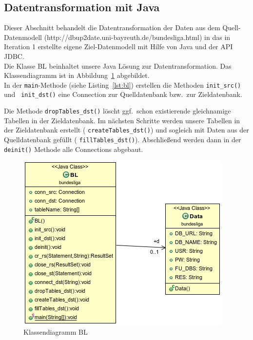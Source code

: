 \documentclass[
10pt,
a4paper
]{scrartcl}
\begin{document}
\subsection{Datentransformation mit Java}

Dieser Abschnitt behandelt die Datentransformation der Daten aus dem Quell-Datenmodell (http://dbup2date.uni-bayreuth.de/bundesliga.html) in das in Iteration 1 erstellte eigene Ziel-Datenmodell mit Hilfe von Java und der API JDBC.\\

Die Klasse BL beinhaltet unsere Java L\"{o}sung zur Datentransformation. Das Klassendiagramm ist in Abbildung~\ref{fig:BL} abgebildet.\\

In der  \texttt{main}-Methode (siehe Listing~\ref{lst:bl}) erstellen die Methoden  \texttt{init\_src()} und \texttt{ init\_dst()} eine Connection zur Quelldatenbank bzw.~zur Zieldatenbank.



Die Methode \texttt{dropTables\_dst()} l\"{o}scht ggf.~schon existierende gleichnamige Tabellen in der Zieldatenbank. Im n\"{a}chsten Schritte werden unsere Tabellen in der Zieldatenbank erstellt ( \texttt{createTables\_dst()}) und sogleich mit Daten aus der Quelldatenbank gef\"{u}llt ( \texttt{fillTables\_dst()}). Abschlie{\ss}end werden dann in der  \texttt{deinit()} Methode alle Connections abgebaut.

\begin{figure}[H]
\centering
\includegraphics[scale=0.7]{BL.png}
\caption{Klassendiagramm BL}
\label{fig:BL}
\end{figure}
\end{document}
